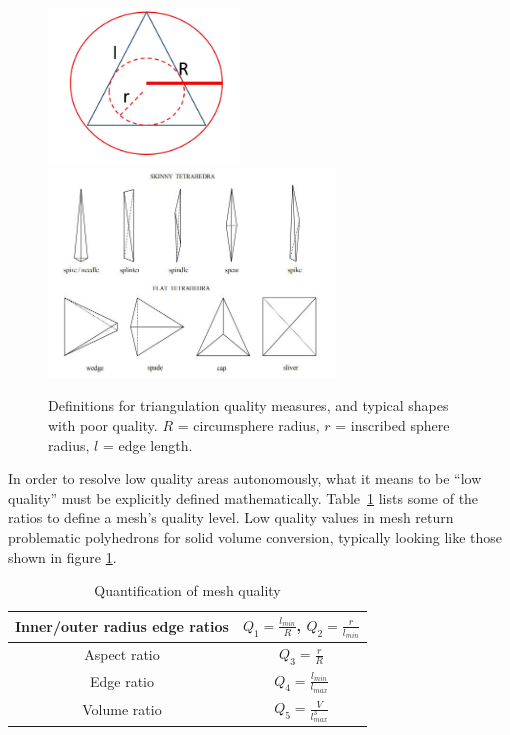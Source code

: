\documentclass[12pt]{drexelthesis}
\begin{document}
\begin{figure}[!ht]
	\centering
		\includegraphics[width=2in]{triangulation_definitions.JPG}
		\includegraphics[width=3in]{bad_tetrahedra.JPG}
		\caption[Definitions for triangulation quality measures]
		{\centering Definitions for triangulation quality measures, and typical shapes with poor quality. $R$ = circumsphere radius, $r$ = inscribed sphere radius, $l$ = edge length.}
		\label{fig:meshquality}
\end{figure}

In order to resolve low quality areas autonomously, what it means to be ``low quality'' must be explicitly defined mathematically. Table~\ref{table:meshquality} lists some of the ratios to define a mesh's quality level. Low  quality  values  in  mesh  return  problematic  polyhedrons  for  solid volume  conversion,  typically  looking  like  those  shown  in  figure \ref{fig:meshquality}.

\begin{table}[!ht]
	\centering
		\caption{Quantification of mesh quality}
		\begin{tabular}{| c | c |}
			\hline
			Inner/outer radius edge ratios & $Q_{1} = \frac{l_{min}}{R}$, $Q_{2} = \frac{r}{l_{min}}$
			\\ \hline
			Aspect ratio & $Q_{3} = \frac{r}{R}$
			\\ \hline
			Edge ratio & $Q_{4} = \frac{l_{min}}{l_{max}}$
			\\ \hline
			Volume ratio & $Q_{5} = \frac{V}{l_{max}^{3}}$
			\\ \hline
		\end{tabular}
		\label{table:meshquality}
\end{table}
\end{document}
